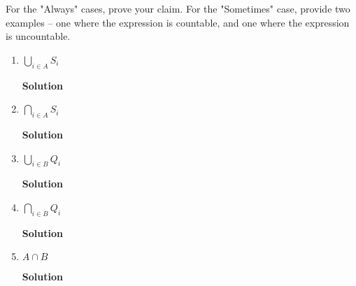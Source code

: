 \documentclass{article}\usepackage{amsmath,amssymb,amsthm,tikz,tkz-graph,color,chngpage,soul,hyperref,csquotes,graphicx,floatrow}\newcommand*{\QEDB}{\hfill\ensuremath{\square}}\newtheorem*{prop}{Proposition}\renewcommand{\theenumi}{\alph{enumi}}\usepackage[shortlabels]{enumitem}\usepackage[nobreak=true]{mdframed}\usetikzlibrary{matrix,calc}\MakeOuterQuote{"}\usepackage[margin=0.75in]{geometry} \newtheorem{theorem}{Theorem}
\begin{document}
\vspace{3mm}
\noindent For the "Always" cases, prove your claim. For the "Sometimes" case, provide two examples -- one where the expression is countable, and one where the expression is uncountable.
\begin{enumerate}
\item $\displaystyle\bigcup_{i\in A} S_i$
\begin{mdframed}
\textbf{Solution}

\end{mdframed}
\item $\displaystyle\bigcap_{i\in A} S_i$
\begin{mdframed}
\textbf{Solution}

\end{mdframed}
\item $\displaystyle\bigcup_{i\in B} Q_i$
\begin{mdframed}
\textbf{Solution}

\end{mdframed}
\item $\displaystyle\bigcap_{i\in B} Q_i$
\begin{mdframed}
\textbf{Solution}

\end{mdframed}
\item $\displaystyle A\cap B$
\begin{mdframed}
\textbf{Solution}

\end{mdframed}
\end{enumerate}
\clearpage
\end{document}
